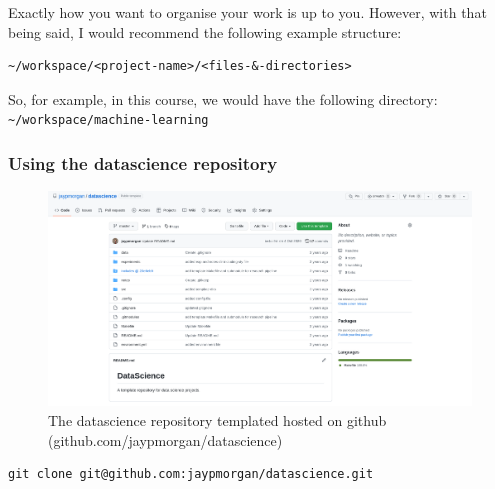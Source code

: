 \documentclass[10pt]{beamer}
\begin{document}
Exactly how you want to organise your work is up to you. However, with that being
said, I would recommend the following example structure:

\begin{verbatim}
~/workspace/<project-name>/<files-&-directories>
\end{verbatim}

So, for example, in this course, we would have the following directory:
\texttt{\textasciitilde{}/workspace/machine-learning}

\subsubsection*{Using the datascience repository}
\label{sec:orgaf46b82}

\begin{figure}[htbp]
\centering
\includegraphics[width=.9\linewidth]{images/datascience-repo.png}
\caption{The datascience repository templated hosted on github (github.com/jaypmorgan/datascience)}
\end{figure} 

\begin{verbatim}
git clone git@github.com:jaypmorgan/datascience.git
\end{verbatim}
\end{document}
